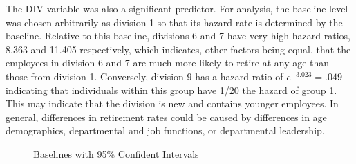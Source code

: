 \documentclass[12pt,letterpaper]{article}
\begin{document}
The DIV variable was also a significant predictor.  For analysis, the baseline level was chosen arbitrarily as division 1 so that its hazard rate is determined by the baseline.  Relative to this baseline, divisions 6 and 7 have very high hazard ratios, 8.363 and 11.405 respectively, which indicates, other factors being equal, that the employees in division 6 and 7 are much more likely to retire at any age than those from division 1.  Conversely, division 9 has a hazard ratio of $e^{-3.023} = .049$ indicating that individuals within this group have 1/20 the hazard of group 1.  This may indicate that the division is new and contains younger employees.  In general, differences in retirement rates could be caused by differences in age demographics, departmental and job functions, or departmental leadership.
\begin{figure}[h!]
	\centering
	\caption{Baselines with 95\% Confident Intervals}
	\label{fig:basepred}
\end{figure}
\end{document}
